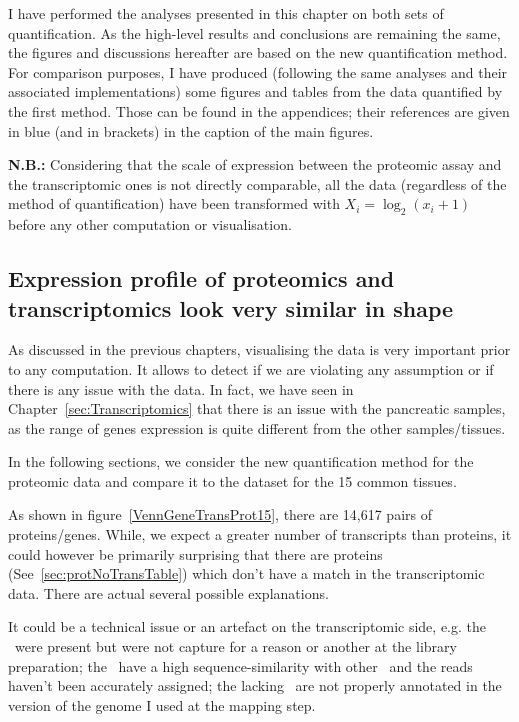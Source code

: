 I have performed the analyses presented in this chapter on both sets of
quantification. As the high-level results and conclusions are remaining the same,
the figures and discussions hereafter are based on
the new quantification method. For comparison purposes,
I have produced (following the same analyses and their associated implementations)
some figures and tables from the data quantified by the first method.
Those can be found in the appendices; their references
are given in blue (and in brackets) in the caption of the main figures.


\textbf{N.B.:} Considering that the scale of expression between
the proteomic assay and the transcriptomic ones is not directly comparable,
all the data (regardless of the method of quantification) have been transformed
with $X_{i}=\log_{2} (x_{i}+1)$ before any other computation or visualisation.

\subsection{Expression profile of proteomics and transcriptomics look very
similar in shape}
\label{sec:IntegrationExpProfileSim}

As discussed in the previous chapters, visualising the data is very important
prior to any computation. It allows to detect if we are violating
any assumption or if there is any issue with the data. In fact, we have seen in
Chapter~\ref{sec:Transcriptomics} that there is an issue with the pancreatic
samples, as the range of genes expression is quite different from the other
samples/tissues.

In the following sections, we consider the new quantification method for the
proteomic data and compare it to the  dataset for the
15 common tissues.

As shown in figure~\ref{VennGeneTransProt15}, there are 14,617 pairs of
proteins/genes. While, we expect a greater number of transcripts than proteins,
it could however be primarily surprising that there are proteins
(See~\ref{sec:protNoTransTable}) which don't have
a match in the transcriptomic data. There are actual several possible explanations.

It could be a technical issue or an artefact on the transcriptomic side, e.g.\:
the \mRNAs\ were present but were not capture for a reason or another at the
library preparation; the \mRNAs\ have a high sequence-similarity with other \mRNAs\
and the reads haven't been accurately assigned; the lacking \mRNAs\ are not properly
annotated in the version of the genome I used at the mapping step.


